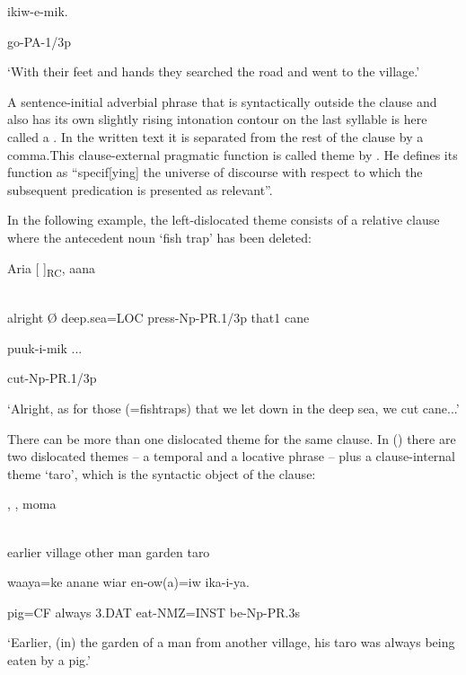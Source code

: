 ikiw-e-mik.

go-PA-1/3p

`With their feet and hands they searched the road and went to the village.'

A sentence-initial adverbial phrase that is syntactically outside the clause and also has its own slightly rising intonation contour on the last syllable is here called a . In the written text it is separated from the rest of the clause by a comma.This clause-external pragmatic function is called theme by \citet[19]{Dik1978}. He defines its function as ``specif[ying] the universe of discourse with respect to which the subsequent predication is presented as relevant''.

 In the following example, the left-dislocated theme consists of a relative clause where the antecedent noun  `fish trap' has been deleted:

\ea%
\label{ex:x1704}
\gll Aria  [\textstyleEmphasizedVernacularWords{{\O}}  ]\textsubscript{RC},  aana  \\
      \\
\glt
\z

alright  {\O}  deep.sea=LOC  press-Np-PR.1/3p  that1  cane  

puuk-i-mik  ...

cut-Np-PR.1/3p

`Alright, as for those (=fishtraps) that we let down in the deep sea, we cut cane...'

There can be more than one dislocated theme for the same clause. In () there are two dislocated themes -- a temporal and a locative phrase -- plus a clause-internal theme  `taro', which is the syntactic object of the clause:

\ea%
\label{ex:x1700}
\gll {},  ,  moma    \\
      \\
\glt
\z

earlier  village  other  man  garden  taro    

waaya=ke  anane  wiar  en-ow(a)=iw  ika-i-ya.

pig=CF  always  3.DAT  eat-NMZ=INST  be-Np-PR.3s

`Earlier, (in) the garden of a man from another village, his taro was always being eaten by a pig.'

